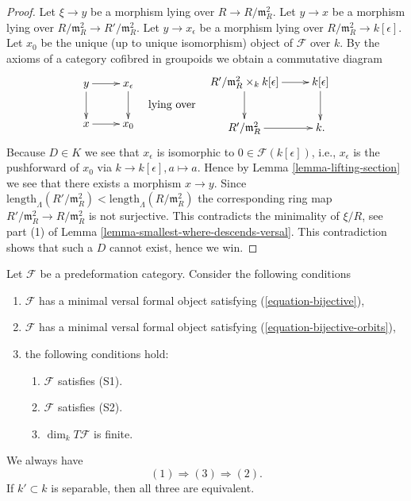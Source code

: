 \begin{proof}
\medskip\noindent
Let $\xi \to y$ be a morphism lying over $R \to R/\mathfrak m_R^2$.
Let $y \to x$ be a morphism lying over
$R/\mathfrak m_R^2 \to R'/\mathfrak m_R^2$.
Let $y \to x_\epsilon$ be a morphism lying over
$R/\mathfrak m_R^2 \to k[\epsilon]$. Let $x_0$ be the unique (up to unique
isomorphism) object of $\mathcal{F}$ over $k$.
By the axioms of a category cofibred in groupoids we obtain
a commutative diagram
$$
\vcenter{
\xymatrix{
y \ar[r] \ar[d] & x_\epsilon \ar[d] \\
x \ar[r]   & x_0
}
}
\quad\text{lying over}\quad
\vcenter{
\xymatrix{
R'/\mathfrak m_R^2 \times_k k[\epsilon] \ar[r] \ar[d] & k[\epsilon] \ar[d] \\
R'/\mathfrak m_R^2 \ar[r] & k.
}
}
$$
Because $D \in K$ we see that $x_\epsilon$ is isomorphic
to $0 \in \mathcal{F}(k[\epsilon])$, i.e., $x_\epsilon$ is
the pushforward of $x_0$ via $k \to k[\epsilon], a \mapsto a$.
Hence by
Lemma \ref{lemma-lifting-section}
we see that there exists a morphism $x \to y$. Since
$\text{length}_\Lambda(R'/\mathfrak m_R^2) <
\text{length}_\Lambda(R/\mathfrak m_R^2)$
the corresponding ring map $R'/\mathfrak m_R^2 \to R/\mathfrak m_R^2$
is not surjective. This contradicts the minimality of
$\xi/R$, see part (1) of
Lemma \ref{lemma-smallest-where-descends-versal}.
This contradiction shows that such a $D$ cannot exist, hence
we win.
\end{proof}

\begin{theorem}
\label{theorem-miniversal-object-existence}
Let $\mathcal{F}$ be a predeformation category.
Consider the following conditions
\begin{enumerate}
\item $\mathcal{F}$ has a minimal versal formal object satisfying
(\ref{equation-bijective}),
\item $\mathcal{F}$ has a minimal versal formal object satisfying
(\ref{equation-bijective-orbits}),
\item the following conditions hold:
\begin{enumerate}
\item $\mathcal{F}$ satisfies (S1).
\item $\mathcal{F}$ satisfies (S2).
\item $\dim_k T\mathcal{F}$ is finite.
\end{enumerate}
\end{enumerate}
We always have
$$
(1) \Rightarrow (3) \Rightarrow (2).
$$
If $k' \subset k$ is separable, then all three are equivalent.
\end{theorem}

